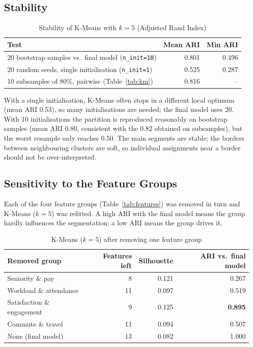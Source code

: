 \documentclass[12pt,a4paper]{article}
\begin{document}
\subsection{Stability}

\begin{table}[H]
\centering
\caption{Stability of K-Means with $k=5$ (Adjusted Rand Index)}
\label{tab:stability}
\small
\begin{tabular}{lrr}
\toprule
\textbf{Test} & \textbf{Mean ARI} & \textbf{Min ARI}\\
\midrule
20 bootstrap samples vs.\ final model (\texttt{n\_init=10}) & 0.801 & 0.496\\
20 random seeds, single initialisation (\texttt{n\_init=1}) & 0.525 & 0.287\\
10 subsamples of 80\%, pairwise (Table~\ref{tab:km})         & 0.816 & --\\
\bottomrule
\end{tabular}
\end{table}

With a single initialisation, K-Means often stops in a different local
optimum (mean ARI 0.53), so many initialisations are needed; the final model
uses 20. With 10 initialisations the partition is reproduced reasonably on
bootstrap samples (mean ARI 0.80, consistent with the 0.82 obtained on
subsamples), but the worst resample only reaches 0.50. The main segments are
stable; the borders between neighbouring clusters are soft, so individual
assignments near a border should not be over-interpreted.

\subsection{Sensitivity to the Feature Groups}
\label{sec:sensitivity}

Each of the four feature groups (Table~\ref{tab:features}) was removed in turn
and K-Means ($k=5$) was refitted. A high ARI with the final model means the
group hardly influences the segmentation; a low ARI means the group drives it.

\begin{table}[H]
\centering
\caption{K-Means ($k=5$) after removing one feature group}
\label{tab:ablation}
\small
\begin{tabular}{lrrr}
\toprule
\textbf{Removed group} & \textbf{Features left} & \textbf{Silhouette}
& \textbf{ARI vs.\ final model}\\
\midrule
Seniority \& pay           & 8  & 0.121 & 0.267\\
Workload \& attendance     & 11 & 0.097 & 0.519\\
Satisfaction \& engagement & 9  & 0.125 & \textbf{0.895}\\
Commute \& travel          & 11 & 0.094 & 0.507\\
\midrule
None (final model)         & 13 & 0.082 & 1.000\\
\bottomrule
\end{tabular}
\end{table}
\end{document}
